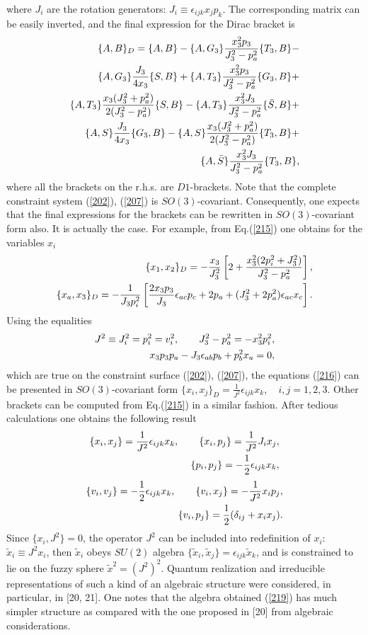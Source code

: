 \documentclass[paper a4]{article}
\begin{document}
where $J_i$ are the rotation generators: $J_i\equiv\epsilon_{ijk}x_jp_k$.
The corresponding matrix can be easily inverted, and the final expression
for the Dirac bracket is
\begin{eqnarray}\label{215}
\{A, B\}_{D}=\{A, B\}-
\{A, G_3\}\frac{x_3^2p_3}{J_3^2-p_a^2}\{T_3, B\}- \cr
\{A, G_3\}\frac{J_3}{4x_3}\{S, B\}+
\{A, T_3\}\frac{x_3^2p_3}{J_3^2-p_a^2}\{G_3, B\}+\cr
\{A, T_3\}\frac{x_3(J_3^2+p_a^2)}{2(J_3^2-p_a^2)}\{S, B\}-
\{A, T_3\}\frac{x_3^2J_3}{J_3^2-p_a^2}\{\bar S, B\}+ \cr
\{A, S\}\frac{J_3}{4x_3}\{G_3, B\}-
\{A, S\}\frac{x_3(J_3^2+p_a^2)}{2(J_3^2-p_a^2)}\{T_3, B\}+ \cr
\{A, \bar S\}\frac{x_3^2J_3}{J_3^2-p_a^2}\{T_3, B\},
\end{eqnarray}
where all the brackets on the r.h.s. are $D1$-brackets.
Note that the complete constraint system (\ref{202}), (\ref{207})
is $SO(3)$-covariant. Consequently, one
expects that the final expressions for the brackets can be rewritten in
$SO(3)$-covariant form also. It is actually the case. For example,
from Eq.(\ref{215}) one obtains for the variables $x_i$
\begin{eqnarray}\label{216}
\{x_1, x_2\}_{D}=-\frac{x_3}{J_3^2}\left[2+
\frac{x_3^2(2p_i^2+J_3^2)}{J_3^2-p_a^2}\right], \cr
\{x_a, x_3\}_{D}=-\frac{1}{J_3p_i^2}
\left[\frac{2x_3p_3}{J_3}\epsilon_{ac}p_c+2p_a+(J_3^2+2p_a^2)
\epsilon_{ac}x_c\right].
\end{eqnarray}
Using the equalities
\begin{eqnarray}\label{217}
J^2\equiv J_i^2=p_i^2=v_i^2, \qquad J_3^2-p_a^2=-x_3^2p_i^2, \cr
x_3p_3p_a-J_3\epsilon_{ab}p_b+p_b^2x_a=0,
\end{eqnarray}
which are true on the constraint surface (\ref{202}), (\ref{207}), the
equations (\ref{216}) can be presented in $SO(3)$-covariant form
$\{x_i, x_j\}_{D}=\frac{1}{J^2}\epsilon_{ijk}x_k$, ~  $i, j=1,2,3$.
Other brackets can be computed from Eq.(\ref{215}) in a similar fashion.
After tedious calculations one obtains the following result
\begin{eqnarray}\label{219}
\{x_i, x_j\}=\frac{1}{J^2}\epsilon_{ijk}x_k, \qquad
\{x_i, p_j\}=\frac{1}{J^2}J_ix_j, \cr
\{p_i, p_j\}=-\frac{1}{2}\epsilon_{ijk}x_k,
\end{eqnarray}
\begin{eqnarray}\label{220}
\{v_i, v_j\}=-\frac{1}{2}\epsilon_{ijk}x_k, \qquad
\{v_i, x_j\}=-\frac{1}{J^2}x_ip_j, \cr
\{v_i, p_j\}=\frac{1}{2}(\delta_{ij}+x_ix_j).
\end{eqnarray}
Since $\{x_i, J^2\}=0$, the operator $J^2$ can be included into
redefinition of $x_i$: $\tilde x_i\equiv J^2x_i$, then $\tilde x_i$
obeys $SU(2)$ algebra
$\{\tilde x_i, \tilde x_j\}=\epsilon_{ijk}\tilde x_k$, and
is constrained to lie on the
fuzzy sphere $\tilde x^2=(J^2)^2$. Quantum realization and
irreducible representations of
such a kind of an algebraic structure were
considered, in particular, in [20, 21]. One notes that the algebra
obtained (\ref{219}) has much simpler structure as
compared with the one proposed in [20] from algebraic considerations.
\end{document}
